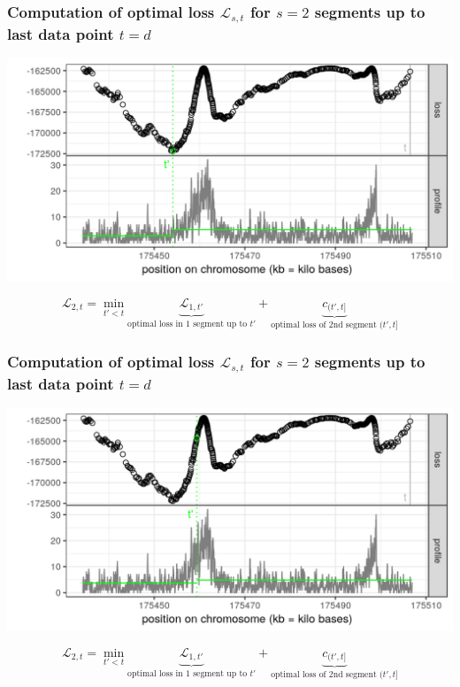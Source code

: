 \begin{frame}
\frametitle{Computation of optimal loss $\mathcal L_{s, t}$
 for $s=2$ segments up to last data point $t = d$}
  \includegraphics[width=\textwidth]{figure-dp-3.png}

$$
\mathcal L_{2, t} =
\min_{
  t' < t
}
\underbrace{
  \mathcal L_{1, t'}
}_{
  \text{optimal loss in 1 segment up to $t'$}
}
+
\underbrace{
  c_{(t', t]}
}_{
  \text{optimal loss of 2nd segment $(t', t]$}
}
$$

\end{frame}
 
\begin{frame}
\frametitle{Computation of optimal loss $\mathcal L_{s, t}$
 for $s=2$ segments up to last data point $t = d$}
  \includegraphics[width=\textwidth]{figure-dp-4.png}

$$
\mathcal L_{2, t} =
\min_{
  t' < t
}
\underbrace{
  \mathcal L_{1, t'}
}_{
  \text{optimal loss in 1 segment up to $t'$}
}
+
\underbrace{
  c_{(t', t]}
}_{
  \text{optimal loss of 2nd segment $(t', t]$}
}
$$

\end{frame}
 
